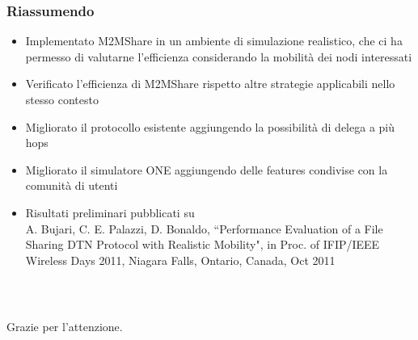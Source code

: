 \documentclass{beamer}
\begin{document}
%

\begin{frame}
\frametitle{Riassumendo}
\label{Riassumendo}
\begin{itemize}
\item Implementato M2MShare in un ambiente di simulazione realistico, che ci ha permesso di valutarne l'efficienza considerando la mobilità dei nodi interessati
\item Verificato l'efficienza di M2MShare rispetto altre strategie applicabili nello stesso contesto
\item Migliorato il protocollo esistente aggiungendo la possibilità di delega a più hops
\item Migliorato il simulatore ONE aggiungendo delle features condivise con la comunità di utenti
\item Risultati preliminari pubblicati su\\
A. Bujari, C. E. Palazzi, D. Bonaldo, ``Performance Evaluation of a File Sharing DTN Protocol with Realistic Mobility", in Proc. of IFIP/IEEE Wireless Days 2011, Niagara
Falls, Ontario, Canada, Oct 2011
\end{itemize}
\end{frame}

\begin{frame}
\frametitle{\ }
\begin{center}
Grazie per l'attenzione.
\end{center}
\end{frame}
\end{document}
